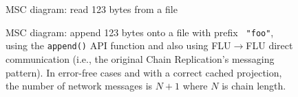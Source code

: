 \documentclass[preprint,10pt]{sigplanconf}
\begin{document}
\begin{figure}[tp]
\caption{MSC diagram: read 123 bytes from a file}
\label{fig:read-flowMSC}
\end{figure}

\begin{figure}[tp]
\caption{MSC diagram: append 123 bytes onto a file with prefix {\tt
    "foo"}, using the {\tt append()} API function and also
  using FLU$\rightarrow$FLU direct communication (i.e., the original
  Chain Replication's messaging pattern).  In error-free cases and with
  a correct cached projection, the number of network messages is $N+1$
  where $N$ is chain length.}
\label{fig:append-flow2MSC}
\end{figure}
\end{document}
